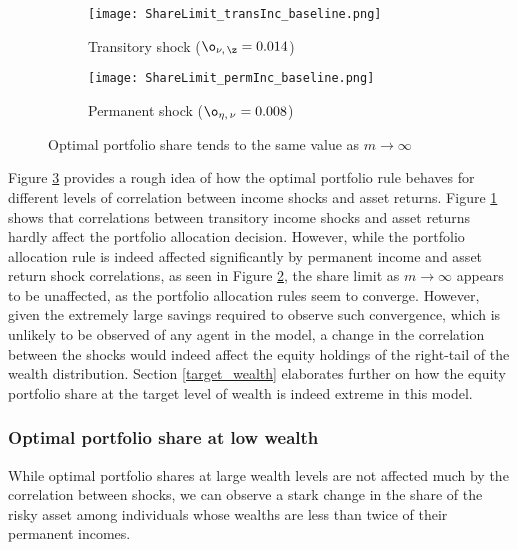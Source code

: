 \begin{figure}[h]
    \centering
    \begin{subfigure}{0.49\textwidth}
        \centering
        \texttt{[image: ShareLimit\_transInc\_baseline.png]}
        \caption{Transitory shock ($\o_{\nu,\,\z} = 0.014$)}
        \label{subfig:shareLimit_baseline_transitory}
    \end{subfigure}
    \begin{subfigure}{0.49\textwidth}
        \centering
        \texttt{[image: ShareLimit\_permInc\_baseline.png]}
        \caption{Permanent shock ($\o_{\eta,\,\nu} = 0.008$)}
        \label{subfig:shareLimit_baseline_permanent}
    \end{subfigure}
    \caption{Optimal portfolio share tends to the same value as $m\to \infty$}
    \label{fig:shareLimit_baseline}
\end{figure}

Figure \ref{fig:shareLimit_baseline} provides a rough idea of how the optimal portfolio rule behaves for different levels of correlation between income shocks and asset returns. Figure \ref{subfig:shareLimit_baseline_transitory} shows that correlations between transitory income shocks and asset returns hardly affect the portfolio allocation decision. However, while the portfolio allocation rule is indeed affected significantly by permanent income and asset return shock correlations, as seen in Figure \ref{subfig:shareLimit_baseline_permanent}, the share limit as $m \to \infty$ appears to be unaffected, as the portfolio allocation rules seem to converge. However, given the extremely large savings required to observe such convergence, which is unlikely to be observed of any agent in the model, a change in the correlation between the shocks would indeed affect the equity holdings of the right-tail of the wealth distribution. Section \ref{target_wealth} elaborates further on how the equity portfolio share at the target level of wealth is indeed extreme in this model.

\subsubsection{Optimal portfolio share at low wealth}\label{portfolio_low_wealth}

While optimal portfolio shares at large wealth levels are not affected much by the correlation between shocks, we can observe a stark change in the share of the risky asset among individuals whose wealths are less than twice of their permanent incomes.


